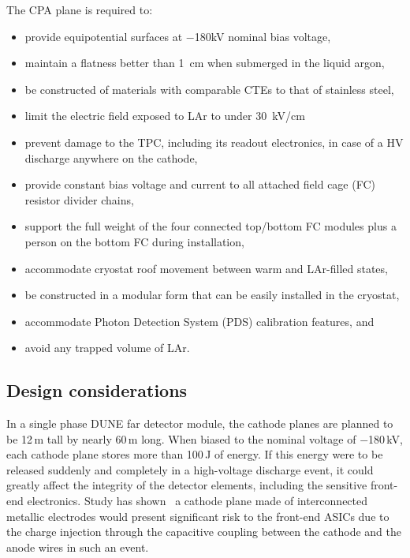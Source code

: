 The CPA plane is required to:
\begin{itemize}
\item provide equipotential surfaces at $-$180kV nominal bias voltage,
\item maintain a flatness better than 1~cm when submerged in the liquid argon,
\item be constructed of materials with comparable CTEs to that of stainless steel, 
\item limit the electric field exposed to LAr to under 30~kV/cm 
\item prevent damage to the TPC, including its readout electronics, in case of a HV discharge anywhere on the cathode,
\item provide constant bias voltage and current to all attached field cage (FC) resistor divider chains,
\item support the full weight of the four connected top/bottom FC modules plus a person on the bottom FC during installation,
\item accommodate cryostat roof movement between warm and LAr-filled states,
\item be constructed in a modular form that can be easily installed in the cryostat,
\item accommodate Photon Detection System (PDS) calibration features, and
\item avoid any trapped volume of LAr.
\end{itemize}

\subsection{Design considerations}


In a single phase DUNE far detector module, the cathode planes are planned to be 12\,m tall by nearly 60\,m long.  When biased to the nominal voltage of $-$180\,kV, each cathode plane stores more than 100\,J of energy. If this energy were to be released  suddenly and completely in a high-voltage discharge event, it could greatly affect the integrity of the detector elements, including the sensitive front-end electronics.  
Study has shown~\cite{cathode-hv-1320} a cathode plane made of interconnected metallic electrodes would present significant risk to the front-end ASICs due to the charge injection through the capacitive coupling between the cathode and the anode wires in such an event.  

